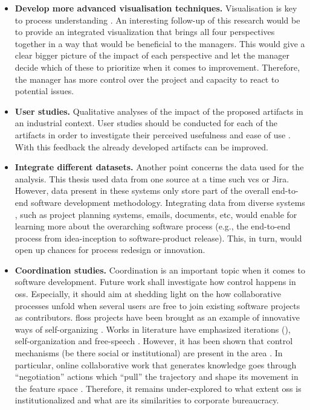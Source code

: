 \begin{itemize}
	\item {\bfseries Develop more advanced visualisation techniques.}
	Visualisation is key to process understanding \citep{DBLP:journals/corr/abs-2202-07941}. An interesting follow-up of this research would be to provide an integrated visualization that brings all four perspectives together in a way that would be beneficial to the managers. This would give a clear bigger picture of the impact of each perspective and let the manager decide which of these to prioritize when it comes to improvement. Therefore, the manager has more control over the project and capacity to react to potential issues. 
	
	\item{\bfseries User studies.}
	Qualitative analyses of the impact of the proposed artifacts in an industrial context. User studies should be conducted for each of the artifacts in order to investigate their perceived usefulness and ease of use \citep{DBLP:journals/misq/VenkateshMDD03}. With this feedback the already developed artifacts can be improved. 
	
	\item{\bfseries Integrate different datasets.}
	Another point concerns the data used for the analysis. This thesis used data from one source at a time such \gls{vcs} or Jira. However, data present in these systems only store part of the overall end-to-end software development methodology. Integrating data from diverse systems \citep{DBLP:conf/icse/TrautschTHLG20}, such as project planning systems, emails, documents, etc, would enable for learning more about the overarching software process (e.g., the end-to-end process from idea-inception to software-product release). This, in turn, would open up chances for process redesign or innovation. 
	
	\item{\bfseries Coordination studies.}
	Coordination is an important topic when it comes to software development. Future work shall investigate how control happens in \gls{oss}. Especially, it should aim at shedding light on the how collaborative processes unfold when several users are free to join existing software projects as contributors. \Gls{floss} projects have been brought as an example of innovative ways of self-organizing \citep{DBLP:journals/mansci/KroghH06,DBLP:journals/misq/HowisonC14}. Works in literature have emphasized iterations (\citealp{Berente2005,Berente2007}), self-organization \citep{DBLP:journals/infsof/CrowstonLWEH07,DBLP:journals/jss/HodaM16} and free-speech \citep{DBLP:conf/chiir/ThomasCMCM18,Gibson2019}. However, it has been shown that control mechanisms (be there social or institutional) are present in the area \citep{Lindberg2016}. In particular, online collaborative work that generates knowledge goes through ``negotiation'' actions which ``pull'' the trajectory and shape its movement in the feature space \citep{Arazy2020}. Therefore, it remains under-explored to what extent \gls{oss} is institutionalized and what are its similarities to corporate bureaucracy.
	

\end{itemize}
